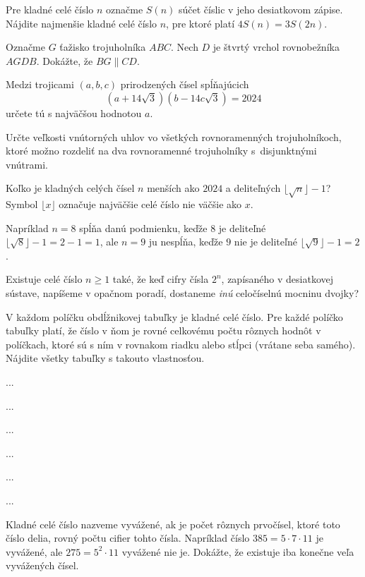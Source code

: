 {%
Pre kladné celé číslo $n$ označme $S(n)$ súčet číslic v jeho desiatkovom zápise. Nájdite najmenšie kladné celé číslo $n$, pre ktoré platí
$4 S(n) = 3 S(2 n).$}

{%
Označme $G$ ťažisko trojuholníka $ABC$. Nech $D$ je štvrtý vrchol rovnobežníka $AGDB$. Dokážte, že $BG \parallel CD$.}

{%
Medzi trojicami $(a,b,c)$ prirodzených čísel spĺňajúcich
$$
\left(a+14\sqrt{3}\right)\left(b-14c\sqrt{3}\right)=2024
$$
určete tú s najväčšou hodnotou $a$.}

{%
Určte veľkosti vnútorných uhlov vo všetkých rovnoramenných trojuholníkoch, ktoré možno rozdeliť na dva rovnoramenné trojuholníky s~disjunktnými vnútrami. }

{%
Koľko je kladných celých čísel $n$ menších ako $2024$ a deliteľných $\lfloor \sqrt{n}\rfloor-1$? Symbol $\lfloor x\rfloor$ označuje najväčšie celé číslo nie väčšie ako $x$.

\nopagebreak\smallskip\noindent
Napríklad $n=8$ spĺňa danú podmienku, keďže $8$ je deliteľné $\lfloor\sqrt{8}\rfloor-1=2-1=1$, ale $n=9$ ju nespĺňa, keďže $9$ nie je deliteľné $\lfloor \sqrt{9}\rfloor -1=2$.}

{%
Existuje celé číslo $n\geq 1$ také, že keď cifry čísla $2^n$, zapísaného v desiatkovej sústave, napíšeme v opačnom poradí, dostaneme \emph{inú} celočíselnú mocninu dvojky?}

{%
V každom políčku obdĺžnikovej tabuľky je kladné celé číslo. Pre každé políčko tabuľky platí, že číslo v ňom je rovné celkovému počtu rôznych hodnôt v políčkach, ktoré sú s ním v rovnakom riadku alebo stĺpci (vrátane seba samého). Nájdite všetky tabuľky s takouto vlastnosťou.}

{%
...}

{%
...}

{%
...}

{%
...}

{%
...}

{%
...}

{%
Kladné celé číslo nazveme vyvážené, ak je počet rôznych prvočísel, ktoré toto číslo delia, rovný počtu cifier tohto čísla. Napríklad číslo $385 = 5 \cdot 7 \cdot  11$ je vyvážené, ale $275 = 5^2 \cdot  11$ vyvážené nie je. Dokážte, že existuje iba konečne veľa vyvážených čísel.}

